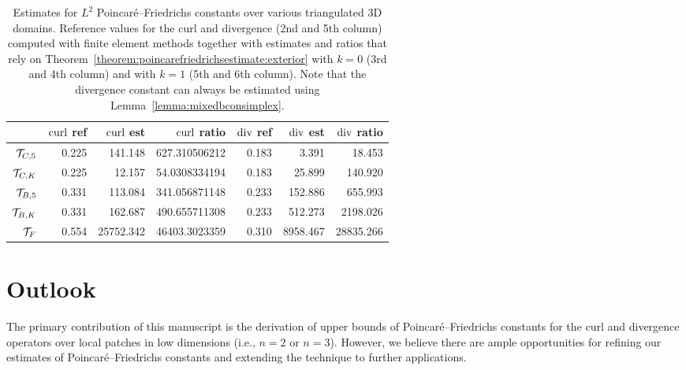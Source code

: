 \documentclass[10pt,a4paper]{article}
\begin{document}
\begin{table}[t]  
    \color{red}
    \centering
    \begin{tabular}{|r||r|r|r||r|r|r|}
        \hline
                        & $\operatorname{curl}$ ref  & $\operatorname{curl}$ est & $\operatorname{curl}$ ratio          & $\operatorname{div}$ ref & $\operatorname{div}$ est & $\operatorname{div}$ ratio \\ 
        \hline
        ${\mathcal T}_{C,5}$   & 0.225        & 141.148     & 627.310506212          & 0.183             & 3.391             & 18.453          \\
        \hline
        ${\mathcal T}_{C,K}$   & 0.225        & 12.157      & 54.0308334194          & 0.183             & 25.899            & 140.920         \\
        \hline
        ${\mathcal T}_{B,5}$   & 0.331        & 113.084     & 341.056871148          & 0.233             & 152.886           & 655.993         \\
        \hline
        ${\mathcal T}_{B,K}$   & 0.331        & 162.687     & 490.655711308          & 0.233             & 512.273           & 2198.026        \\
        \hline
        ${\mathcal T}_{F}$     & 0.554        & 25752.342   & 46403.3023359          & 0.310             & 8958.467          & 28835.266       \\ 
        \hline
    \end{tabular}
    \caption{
    Estimates for $L^2$ Poincar\'e--Friedrichs constants over various triangulated 3D domains.
    Reference values for the curl and divergence (2nd and 5th column) computed with finite element methods together with estimates and ratios
    that rely on Theorem~\ref{theorem:poincarefriedrichsestimate:exterior} with $k=0$ (3rd and 4th column) and with $k=1$ (5th and 6th column).
    Note that the divergence constant can always be estimated using Lemma~\ref{lemma:mixedbconsimplex}.
    }\label{table:estimates3D:curldiv}
\end{table}





\section{Outlook}\label{section:outlook}

The primary contribution of this manuscript is the derivation of upper bounds of Poincar\'e--Friedrichs constants for the curl and divergence operators over local patches in low dimensions (i.e., $n=2$ or $n=3$).
However, we believe there are ample opportunities for refining our estimates of Poincar\'e--Friedrichs constants and extending the technique to further applications.
\end{document}

